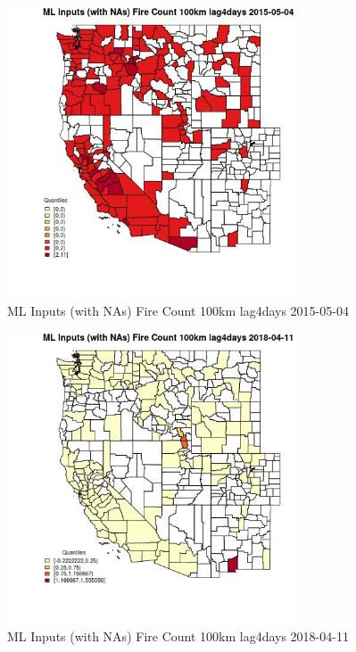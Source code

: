 \begin{figure} 
\centering  
\includegraphics[width=0.77\textwidth]{Code_Outputs/Report_ML_input_PM25_Step4_part_e_de_duplicated_aves_compiled_2019-05-18wNAs_CountyFire_Count_100km_lag4daysMean2015-05-04_2015-05-04.jpg} 
\caption{\label{fig:Report_ML_input_PM25_Step4_part_e_de_duplicated_aves_compiled_2019-05-18wNAsCountyFire_Count_100km_lag4daysMean2015-05-04_2015-05-04}ML Inputs (with NAs) Fire Count 100km lag4days 2015-05-04} 
\end{figure} 
 

\begin{figure} 
\centering  
\includegraphics[width=0.77\textwidth]{Code_Outputs/Report_ML_input_PM25_Step4_part_e_de_duplicated_aves_compiled_2019-05-18wNAs_CountyFire_Count_100km_lag4daysMean2018-04-11_2018-04-11.jpg} 
\caption{\label{fig:Report_ML_input_PM25_Step4_part_e_de_duplicated_aves_compiled_2019-05-18wNAsCountyFire_Count_100km_lag4daysMean2018-04-11_2018-04-11}ML Inputs (with NAs) Fire Count 100km lag4days 2018-04-11} 
\end{figure} 
 

